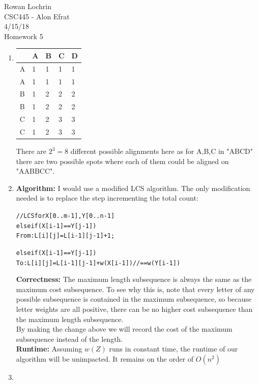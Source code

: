 \documentclass[11pt]{article}
\begin{document}
\begin{flushleft}
	Rowan Lochrin \\
	CSC445 - Alon Efrat\\
	4/15/18 \\
	Homework 5
\end{flushleft}
\begin{enumerate}

		\item 
		\begin{center}
		\begin{tabular}{l|l l l l}
			 &A&B&C&D\\
			\hline
			A&1&1&1&1\\
			A&1&1&1&1\\
			B&1&2&2&2\\
			B&1&2&2&2\\
			C&1&2&3&3\\
			C&1&2&3&3\\
		\end{tabular}
		\end{center}
			There are $2^3 = 8$ different possible alignments here
			as for A,B,C in "ABCD" there are two possible spots
			where each of them could be aligned on "AABBCC".
		\item 
		\textbf{Algorithm:}
			I would use a modified LCS algorithm.
			The only modification needed is to replace the step
			incrementing the total count:
			\begin{alltt}
			// LCS for X[0..m-1], Y[0..n-1]
			else if (X[i-1] == Y[j-1])
				From: L[i][j] = L[i-1][j-1] + 1;
			\end{alltt}
			\begin{alltt}
			else if (X[i-1] == Y[j-1])
				To : L[i][j] = L[i-1][j-1] + w(X[i-1]) // == w(Y[i-1])
			\end{alltt}
		\textbf{Correctness:}
			The maximum length subsequence is always the
			same as the maximum cost subsequence. To see why this is,
			note that every letter of any possible subsequence is contained
			in the maximum subsequence, so
			because letter weights are all positive, there can be no
			higher cost subsequence than the maximum length
			subsequence.\\
			By making the change above we will record the
			cost of the maximum subsequence instead of the length.\\
		\textbf{Runtime:}
			Assuming $w(Z)$ runs in constant time, the runtime of
			our algorithm will be unimpacted. It remains on the
			order of $O(n^2)$
		\item 

\end{enumerate}
\end{document}
